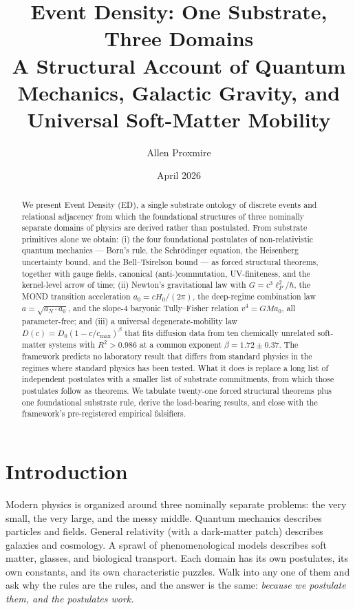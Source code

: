 \documentclass[11pt,a4paper]{article}
\title{Event Density: One Substrate, Three Domains\\[4pt]
\large A Structural Account of Quantum Mechanics, Galactic Gravity, and Universal Soft-Matter Mobility}
\author{Allen Proxmire}
\date{April 2026}
\begin{document}
\maketitle

\begin{abstract}
We present Event Density (ED), a single substrate ontology of discrete events and relational adjacency from which the foundational structures of three nominally separate domains of physics are derived rather than postulated. From substrate primitives alone we obtain: (i) the four foundational postulates of non-relativistic quantum mechanics --- Born's rule, the Schr\"odinger equation, the Heisenberg uncertainty bound, and the Bell--Tsirelson bound --- as forced structural theorems, together with gauge fields, canonical (anti-)commutation, UV-finiteness, and the kernel-level arrow of time; (ii) Newton's gravitational law with $G = c^3 \ell_P^2 / \hbar$, the MOND transition acceleration $a_0 = c H_0 / (2\pi)$, the deep-regime combination law $a = \sqrt{a_N \cdot a_0}$, and the slope-4 baryonic Tully--Fisher relation $v^4 = G M a_0$, all parameter-free; and (iii) a universal degenerate-mobility law $D(c) = D_0 (1 - c/c_\mathrm{max})^\beta$ that fits diffusion data from ten chemically unrelated soft-matter systems with $R^2 > 0.986$ at a common exponent $\beta = 1.72 \pm 0.37$. The framework predicts no laboratory result that differs from standard physics in the regimes where standard physics has been tested. What it does is replace a long list of independent postulates with a smaller list of substrate commitments, from which those postulates follow as theorems. We tabulate twenty-one forced structural theorems plus one foundational substrate rule, derive the load-bearing results, and close with the framework's pre-registered empirical falsifiers.
\end{abstract}

\section{Introduction}

Modern physics is organized around three nominally separate problems: the very small, the very large, and the messy middle. Quantum mechanics describes particles and fields. General relativity (with a dark-matter patch) describes galaxies and cosmology. A sprawl of phenomenological models describes soft matter, glasses, and biological transport. Each domain has its own postulates, its own constants, and its own characteristic puzzles. Walk into any one of them and ask why the rules are the rules, and the answer is the same: \emph{because we postulate them, and the postulates work.}
\end{document}
